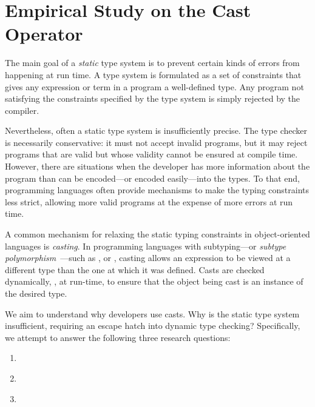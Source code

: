 \chapter{Empirical Study on the Cast Operator}
\label{cha:casts}

The main goal of a \emph{static} type system
is to prevent certain kinds of errors from happening at run time.
A type system is formulated as a set of constraints that gives any expression or term in a program a well-defined type.
Any program not satisfying the constraints specified by the type system is
simply rejected by the compiler.

Nevertheless, often a static type system is insufficiently precise.
The type checker is necessarily conservative:
it must not accept invalid programs,
but it may reject programs that are valid but whose validity cannot be ensured at compile time.
However, there are situations when the developer has more information
about the program than can be encoded---or encoded easily---into the types.
To that end, programming languages often provide mechanisms to make the typing constraints less strict,
allowing more valid programs at the expense of more errors at run time.

A common mechanism for relaxing the static typing constraints in object-oriented languages is \emph{casting}.
In programming languages with subtyping---or \emph{subtype polymorphism}~\citep{cardelliUnderstandingTypesData1985}---such as \java{}, \csharp{} or \cpp{},
casting allows an expression to be viewed at a different type than the one at which it was defined.
Casts are checked dynamically, \ie, at run-time, to ensure that the object
being cast is an instance of the desired type.

We aim to understand why developers use casts.
Why is the static type system insufficient,
requiring an escape hatch into dynamic type checking?
Specifically, we attempt to answer the following three research questions:

\begin{enumerate}[label=RQ/C\arabic*:,ref=RQ/C\arabic*,leftmargin=3.4\parindent]
\item\label{casts:rq1}{\bf \crqA} \crqAdesc{}
\item\label{casts:rq2}{\bf \crqB} \crqBdesc{}
\item\label{casts:rq3}{\bf \crqC} \crqCdesc{}
\end{enumerate}

